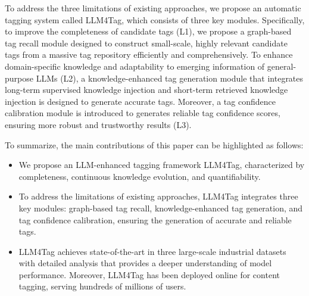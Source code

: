 To address the three limitations of existing approaches, we propose an automatic tagging system called LLM4Tag, which consists of three key modules.
Specifically, to improve the completeness of candidate tags (L1), we propose a graph-based tag recall module designed to construct small-scale, highly relevant candidate tags from a massive tag repository efficiently and comprehensively.
To enhance domain-specific knowledge and adaptability to emerging information of general-purpose LLMs (L2), a knowledge-enhanced tag generation module that integrates long-term supervised knowledge injection and short-term retrieved knowledge injection is designed to generate accurate tags.
Moreover, a tag confidence calibration module is introduced to generates reliable tag confidence scores, ensuring more robust and trustworthy results (L3). 


To summarize, the main contributions of this paper can be highlighted as follows:
\begin{itemize}[leftmargin=12pt]
\item We propose an LLM-enhanced tagging framework LLM4Tag, characterized by completeness, continuous knowledge evolution, and quantifiability.
\item  To address the limitations of existing approaches, LLM4Tag integrates three key modules: graph-based tag recall, knowledge-enhanced tag generation, and tag confidence calibration, ensuring the generation of accurate and reliable tags.
\item LLM4Tag achieves state-of-the-art in three large-scale industrial datasets with detailed analysis that provides a deeper understanding of model performance.
Moreover, LLM4Tag has been deployed online for content tagging, serving hundreds of millions of users. 
\end{itemize}













